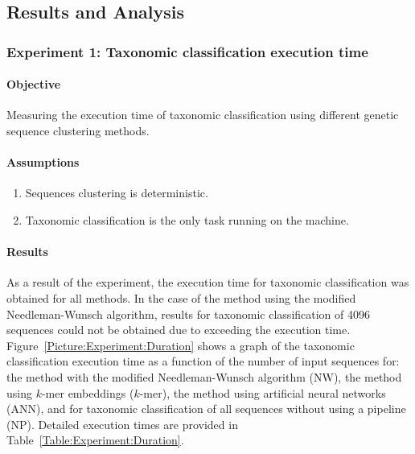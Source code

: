 \documentclass[pdflatex,sn-vancouver-num]{sn-jnl}%
\begin{document}
        \subsection{Results and Analysis}
            \subsubsection{Experiment 1: Taxonomic classification execution time}
                \paragraph{Objective} 
                Measuring the execution time of taxonomic classification using different genetic sequence clustering methods.

                \paragraph{Assumptions}
                \begin{enumerate}
                    \item {
                        Sequences clustering is deterministic.
                    }
                    \item {
                        Taxonomic classification is the only task running on the machine.
                    }
                \end{enumerate}

                \paragraph{Results}
                As a result of the experiment, the execution time for taxonomic classification was obtained for all methods. In the case of the method using the modified Needleman-Wunsch algorithm, results for taxonomic classification of 4096 sequences could not be obtained due to exceeding the execution time. Figure~\ref{Picture:Experiment:Duration} shows a graph of the taxonomic classification execution time as a function of the number of input sequences for: the method with the modified Needleman-Wunsch algorithm (NW), the method using $k$-mer embeddings ($k$-mer), the method using artificial neural networks (ANN), and for taxonomic classification of all sequences without using a pipeline (NP). Detailed execution times are provided in Table~\ref{Table:Experiment:Duration}.
\end{document}
